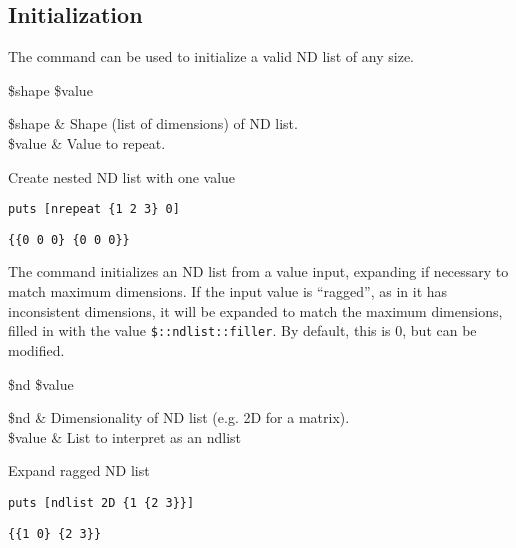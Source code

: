 \documentclass{article}
\begin{document}
\clearpage
\subsection{Initialization}
The command  can be used to initialize a valid ND list of any size.
\begin{syntax}
 \$shape \$value
\end{syntax}
\begin{args}
\$shape & Shape (list of dimensions) of ND list. \\
\$value & Value to repeat.
\end{args}
\begin{example}{Create nested ND list with one value}
\begin{lstlisting}
puts [nrepeat {1 2 3} 0]
\end{lstlisting}
\tcblower
\begin{lstlisting}
{{0 0 0} {0 0 0}}
\end{lstlisting}
\end{example}

The command  initializes an ND list from a value input, expanding if necessary to match maximum dimensions.
If the input value is ``ragged'', as in it has inconsistent dimensions, it will be expanded to match the maximum dimensions, filled in with the value \texttt{\$::ndlist::filler}. By default, this is 0, but can be modified.
\begin{syntax}
 \$nd \$value
\end{syntax}
\begin{args}
\$nd & Dimensionality of ND list (e.g. 2D for a matrix).  \\
\$value & List to interpret as an ndlist
\end{args}
\begin{example}{Expand ragged ND list}
\begin{lstlisting}
puts [ndlist 2D {1 {2 3}}]
\end{lstlisting}
\tcblower
\begin{lstlisting}
{{1 0} {2 3}}
\end{lstlisting}
\end{example}

\clearpage
\end{document}
